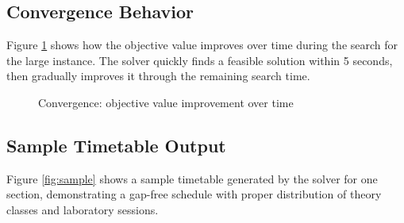\documentclass[12pt,a4paper]{article}
\begin{document}
\subsection{Convergence Behavior}

Figure \ref{fig:convergence} shows how the objective value improves over time during the search for the large instance. The solver quickly finds a feasible solution within 5 seconds, then gradually improves it through the remaining search time.

\begin{figure}[H]
\centering
{}
\caption{Convergence: objective value improvement over time}
\label{fig:convergence}
\end{figure}

\subsection{Sample Timetable Output}

Figure \ref{fig:sample} shows a sample timetable generated by the solver for one section, demonstrating a gap-free schedule with proper distribution of theory classes and laboratory sessions.
\end{document}
